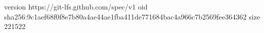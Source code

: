 version https://git-lfs.github.com/spec/v1
oid sha256:9c1aef68f0f8e7b80a4ae44ae1fba411de771684bac4a966c7b2569fee364362
size 221522

